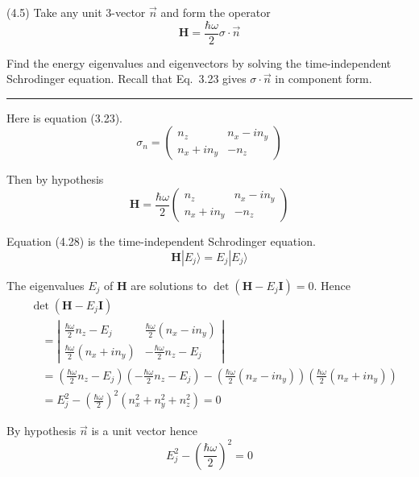 \documentclass[12pt]{article}
\begin{document}
(4.5)
Take any unit 3-vector $\vec n$ and form the operator
\begin{equation*}
\mathbf H=\frac{\hbar\omega}{2}\sigma\cdot\vec n
\end{equation*}

Find the energy eigenvalues and eigenvectors by solving the
time-independent Schrodinger equation.
Recall that Eq.~3.23 gives $\sigma\cdot\vec n$ in component form.

\bigskip
\hrule

\bigskip
Here is equation (3.23).
\begin{equation*}
\sigma_n=\begin{pmatrix}
n_z & n_x-in_y
\\
n_x+in_y & -n_z
\end{pmatrix}
\tag{3.23}
\end{equation*}

Then by hypothesis
\begin{equation*}
\mathbf H=\frac{\hbar\omega}{2}
\begin{pmatrix}
n_z & n_x-in_y
\\
n_x+in_y & -n_z
\end{pmatrix}
\end{equation*}

Equation (4.28) is the time-independent Schrodinger equation.
\begin{equation*}
\mathbf H|E_j\rangle=E_j|E_j\rangle
\tag{4.28}
\end{equation*}

The eigenvalues $E_j$ of $\mathbf H$ are solutions to $\det(\mathbf H-E_j\mathbf I)=0$.
Hence
\begin{align*}
&\det(\mathbf H-E_j\mathbf I)
\\
&\quad{}=\left|
\begin{matrix}
\frac{\hbar\omega}{2}n_z-E_j & \frac{\hbar\omega}{2}(n_x-in_y)
\\[1ex]
\frac{\hbar\omega}{2}(n_x+in_y) & -\frac{\hbar\omega}{2}n_z-E_j
\end{matrix}
\right|
\\
&\quad{}=\left(\frac{\hbar\omega}{2}n_z-E_j\right)\left(-\frac{\hbar\omega}{2}n_z-E_j\right)
-\left(\frac{\hbar\omega}{2}(n_x-in_y)\right)\left(\frac{\hbar\omega}{2}(n_x+in_y)\right)
\\
&\quad{}=E_j^2-\left(\frac{\hbar\omega}{2}\right)^2\left(n_x^2+n_y^2+n_z^2\right)=0
\end{align*}

By hypothesis $\vec n$ is a unit vector hence
\begin{equation*}
E_j^2-\left(\frac{\hbar\omega}{2}\right)^2=0
\end{equation*}
\end{document}
